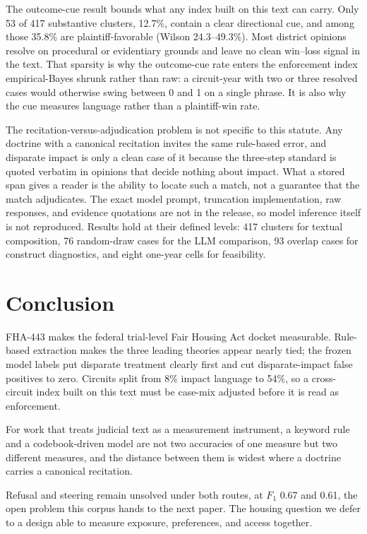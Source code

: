 \documentclass[11pt]{article}
\begin{document}
The outcome-cue result bounds what any index built on this text can carry. Only 53 of 417 substantive clusters, 12.7\%, contain a clear directional cue, and among those 35.8\% are plaintiff-favorable (Wilson 24.3--49.3\%). Most district opinions resolve on procedural or evidentiary grounds and leave no clean win--loss signal in the text. That sparsity is why the outcome-cue rate enters the enforcement index empirical-Bayes shrunk rather than raw: a circuit-year with two or three resolved cases would otherwise swing between 0 and 1 on a single phrase. It is also why the cue measures language rather than a plaintiff-win rate.

The recitation-versus-adjudication problem is not specific to this statute. Any doctrine with a canonical recitation invites the same rule-based error, and disparate impact is only a clean case of it because the three-step standard is quoted verbatim in opinions that decide nothing about impact. What a stored span gives a reader is the ability to locate such a match, not a guarantee that the match adjudicates. The exact model prompt, truncation implementation, raw responses, and evidence quotations are not in the release, so model inference itself is not reproduced. Results hold at their defined levels: 417 clusters for textual composition, 76 random-draw cases for the LLM comparison, 93 overlap cases for construct diagnostics, and eight one-year cells for feasibility.

\section{Conclusion}

FHA-443 makes the federal trial-level Fair Housing Act docket measurable. Rule-based extraction makes the three leading theories appear nearly tied; the frozen model labels put disparate treatment clearly first and cut disparate-impact false positives to zero. Circuits split from 8\% impact language to 54\%, so a cross-circuit index built on this text must be case-mix adjusted before it is read as enforcement.

For work that treats judicial text as a measurement instrument, a keyword rule and a codebook-driven model are not two accuracies of one measure but two different measures, and the distance between them is widest where a doctrine carries a canonical recitation.

Refusal and steering remain unsolved under both routes, at $F_1$ 0.67 and 0.61, the open problem this corpus hands to the next paper. The housing question we defer to a design able to measure exposure, preferences, and access together.
\end{document}
